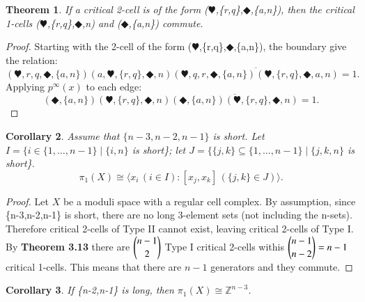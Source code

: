 \documentclass{amsart}
\newtheorem{theorem}{Theorem}[section]
\newtheorem{corollary}[theorem]{Corollary}
\newcommand{\bz}{\ensuremath{\mathbb{Z}}} %
\begin{document}
\begin{theorem}
If a critical 2-cell is of the form ($\varheartsuit$,\{r,q\},$\Diamondblack$,\{a,n\}), then the critical 1-cells ($\varheartsuit$,\{r,q\},$\Diamondblack$,n) and ($\Diamondblack$,\{a,n\}) commute.
\end{theorem}

\begin{proof}
Starting with the 2-cell of the form ($\varheartsuit$,\{r,q\},$\Diamondblack$,\{a,n\}), the boundary give the relation:
\begin{equation*}
(\varheartsuit,r,q,\Diamondblack,\{a,n\})(a,\varheartsuit,\{r,q\},\Diamondblack,n)\overline{(\varheartsuit,q,r,\Diamondblack,\{a,n\})(\varheartsuit,\{r,q\},\Diamondblack,a,n)}=1.
\end{equation*}
Applying $p^{\infty}(x)$ to each edge:
\begin{equation*}
(\Diamondblack,\{a,n\})(\varheartsuit,\{r,q\},\Diamondblack,n)\overline{(\Diamondblack,\{a,n\})(\varheartsuit,\{r,q\},\Diamondblack,n)}=1.
\end{equation*}
\end{proof}

\begin{corollary}
Assume that $\{n-3, n-2, n-1\}$ is short. Let $I = \{ i \in \{1,\ldots, n-1\} \mid \{i,n\}$ is short\}; let $J = \{ \{j,k\} \subseteq \{1,\ldots, n-1\} \mid \{j,k,n\}$ is short\}.
\[ \pi_{1}(X)\cong\langle x_i \, (i \in I): [x_{j}, x_{k}] \, (\{j,k\}\in J) \rangle. \]
\end{corollary}

\begin{proof}
Let $X$ be a moduli space with a regular cell complex. By assumption, since \{n-3,n-2,n-1\} is short, there are no long 3-element sets (not including the n-sets). Therefore critical 2-cells of Type II cannot exist, leaving critical 2-cells of Type I. By \textbf{Theorem 3.13} there are $\dbinom{n-1}{2}$ Type I critical 2-cells withis $\dbinom{n-1}{n-2}=n-1$ critical 1-cells. This means that there are $n-1$ generators and they commute.

\end{proof}

\begin{corollary}
If \{n-2,n-1\} is long, then $\pi_{1}(X)\cong\bz^{n-3}$.
\end{corollary}
\end{document}
